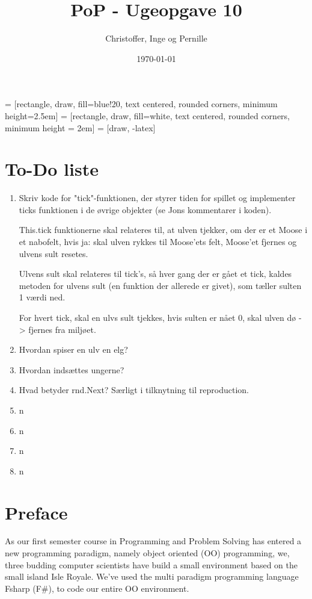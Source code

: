 \documentclass[a4paper]{report}
\title{PoP - Ugeopgave 10}
\author{Christoffer, Inge og Pernille}
\date{\today}
\begin{document}
\maketitle
{} = [rectangle, draw, fill=blue!20, text centered,
    rounded corners, minimum height=2.5em]
 = [rectangle, draw, fill=white, text centered,
    rounded corners, minimum height = 2em]
 = [draw, -latex]

\section*{To-Do liste}

\begin{enumerate}

\item Skriv kode for "tick"-funktionen, der styrer tiden for spillet og implementer ticks funktionen i de øvrige objekter (se Jons kommentarer i koden).

This.tick funktionerne skal relateres til, at ulven tjekker, om der er et Moose i et nabofelt, hvis ja: skal ulven rykkes til Moose'ets felt, Moose'et fjernes og ulvens sult resetes.

Ulvens sult skal relateres til tick's, så hver gang der er gået et tick, kaldes metoden for ulvens sult (en funktion der allerede er givet), som tæller sulten 1 værdi ned.

For hvert tick, skal en ulvs sult tjekkes, hvis sulten er nået 0, skal ulven dø -> fjernes fra miljøet.
\item Hvordan spiser en ulv en elg?
\item Hvordan indsættes ungerne?
\item Hvad betyder rnd.Next? Særligt i tilknytning til reproduction.
\item n
\item n
\item n
\item n

\end{enumerate}

\newpage

\section*{Preface}
As our first semester course in Programming and Problem Solving has entered a new programming paradigm, namely object oriented (OO) programming, we, three budding computer scientists have build a small environment based on the small island Isle Royale. We've used the multi paradigm programming language Fsharp (F\#), to code our entire OO environment.
\end{document}
